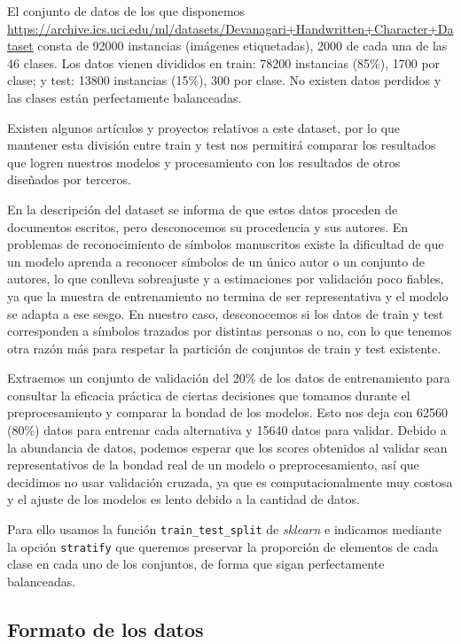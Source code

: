 \documentclass[a4]{article}
\begin{document}
El conjunto de datos de los que disponemos \\
\href{https://archive.ics.uci.edu/ml/datasets/Devanagari+Handwritten+Character+Dataset}{https://archive.ics.uci.edu/ml/datasets/Devanagari+Handwritten+Character+Dataset}
consta de 92000 instancias (imágenes etiquetadas), 2000 de cada una de
las 46 clases. Los datos vienen divididos en train: 78200 instancias
(85\%), 1700 por clase; y test: 13800 instancias (15\%), 300 por
clase. No existen datos perdidos y las clases están perfectamente
balanceadas.

Existen algunos artículos y proyectos relativos a este dataset, por lo
que mantener esta división entre train y test nos permitirá
comparar los resultados que logren nuestros modelos y procesamiento
con los resultados de otros diseñados por terceros. 

En la descripción del dataset se informa de que estos datos proceden
de documentos escritos, pero desconocemos su procedencia y sus
autores. En problemas de reconocimiento de símbolos manuscritos existe
la dificultad de que un modelo aprenda a reconocer símbolos de un
único autor o un conjunto de autores, lo que conlleva sobreajuste y a
estimaciones por validación poco fiables, ya que la muestra de
entrenamiento no termina de ser representativa y el modelo se adapta a
ese sesgo. En nuestro caso, desconocemos si los datos de train y test
corresponden a símbolos trazados por distintas personas o no, con lo
que tenemos otra razón más para respetar la partición de conjuntos de
train y test existente.

Extraemos un conjunto de validación del 20\% de los datos de
entrenamiento para consultar la eficacia práctica de ciertas
decisiones que tomamos durante el preprocesamiento y comparar la
bondad de los modelos. Esto nos deja con 62560 (80\%) datos para
entrenar cada alternativa y 15640 datos para validar. Debido a la
abundancia de datos, podemos esperar que los scores obtenidos al
validar sean representativos de la bondad real de un modelo o
preprocesamiento, así que decidimos no usar validación cruzada, ya que
es computacionalmente muy costosa y el ajuste de los modelos es lento
debido a la cantidad de datos.

Para ello usamos la función \texttt{train\_test\_split} de
\textit{sklearn} e indicamos mediante la opción \texttt{stratify} que
queremos preservar la proporción de elementos de cada clase en cada
uno de los conjuntos, de forma que sigan perfectamente balanceadas.

\subsection{Formato de los datos}
\end{document}
